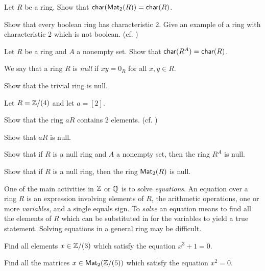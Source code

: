 \begin{exercise}
Let \(R\) be a ring. Show that \(\mathsf{char}(\mathsf{Mat}_{2}(R)) = \mathsf{char}(R)\).
\end{exercise}

\begin{exercise}
Show that every boolean ring has characteristic 2. Give an example of a ring with characteristic 2 which is not boolean. (cf. )
\end{exercise}

\begin{exercise}
Let \(R\) be a ring and \(A\) a nonempty set. Show that \(\mathsf{char}(R^A) = \mathsf{char}(R)\).
\end{exercise}

\begin{dfn} \label{dfn:null-ring}
We say that a ring \(R\) is \emph{null}  if \(xy = 0_R\) for all \(x,y \in R\).
\end{dfn}

\begin{exercise}
Show that the trivial ring is null.
\end{exercise}

\begin{exercise}
Let \(R = \mathbb{Z}/(4)\) and let \(a = [2]\).
\begin{proplist*}
\item Show that the ring \(aR\) contains 2 elements. (cf. )
\item Show that \(aR\) is null.
\end{proplist*}
\end{exercise}

\begin{exercise}
Show that if \(R\) is a null ring and \(A\) a nonempty set, then the ring \(R^A\) is null.
\end{exercise}

\begin{exercise}
Show that if \(R\) is a null ring, then the ring \(\mathsf{Mat}_{2}(R)\) is null.
\end{exercise}

One of the main activities in \(\mathbb{Z}\) or \(\mathbb{Q}\) is to solve \emph{equations}. An equation over a ring \(R\) is an expression involving elements of \(R\), the arithmetic operations, one or more \emph{variables}, and a single equals sign. To \emph{solve} an equation means to find all the elements of \(R\) which can be substituted in for the variables to yield a true statement. Solving equations in a general ring may be difficult. \medskip

\begin{exercise}
Find all elements \(x \in \mathbb{Z}/(3)\) which satisfy the equation \(x^3 + 1 = 0\).
\end{exercise}

\begin{exercise}
Find all the matrices \(x \in \mathsf{Mat}_{2}(\mathbb{Z}/(5))\) which satisfy the equation \(x^2 = 0\).
\end{exercise}
